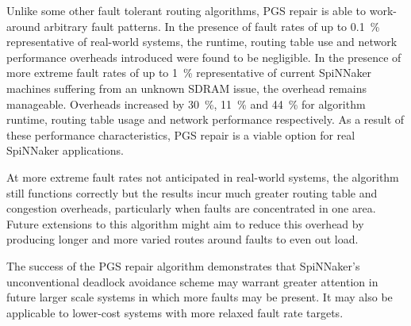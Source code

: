 		Unlike some other fault tolerant routing algorithms, PGS repair is able to
		work-around arbitrary fault patterns.  In the presence of fault rates of up
		to \SI{0.1}{\percent} representative of real-world systems, the runtime,
		routing table use and network performance overheads introduced were found
		to be negligible.  In the presence of more extreme fault rates of up to
		\SI{1}{\percent} representative of current SpiNNaker machines suffering
		from an unknown SDRAM issue, the overhead remains manageable. Overheads
		increased by \SI{30}{\percent}, \SI{11}{\percent} and \SI{44}{\percent} for
		algorithm runtime, routing table usage and network performance
		respectively.  As a result of these performance characteristics, PGS repair
		is a viable option for real SpiNNaker applications.
		
		At more extreme fault rates not anticipated in real-world systems, the
		algorithm still functions correctly but the results incur much greater
		routing table and congestion overheads, particularly when faults are
		concentrated in one area. Future extensions to this algorithm might aim to
		reduce this overhead by producing longer and more varied routes around
		faults to even out load.
		
		The success of the PGS repair algorithm demonstrates that SpiNNaker's
		unconventional deadlock avoidance scheme may warrant greater attention in
		future larger scale systems in which more faults may be present. It may
		also be applicable to lower-cost systems with more relaxed fault rate
		targets.
